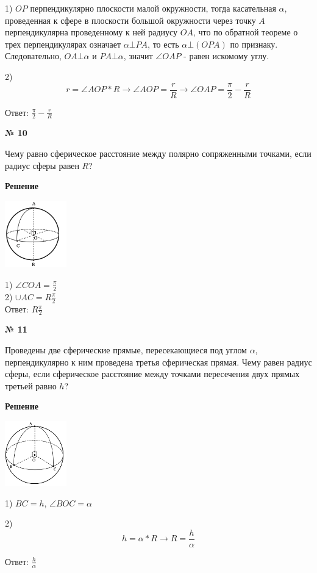     1) $OP$ перпендикулярно плоскости малой окружности, тогда касательная $\alpha$, проведенная к сфере
    в плоскости большой окружности через точку $A$ перпендикулярна проведенному к ней радиусу $OA$,
    что по обратной теореме о трех перпендикулярах означает $\alpha \bot PA$, то есть $\alpha \bot (OPA)$ по признаку.
    Следовательно, $OA \bot \alpha$ и $PA \bot \alpha$, значит $\angle OAP$ - равен искомому углу.

    2)
    \[
        r = \angle AOP * R \rightarrow \angle AOP = \frac{r}{R} \rightarrow \angle OAP = \frac{\pi}{2} - \frac{r}{R}
    \]

    Ответ: $\frac{\pi}{2} - \frac{r}{R}$

    \begin{center}
        \textbf{№ 10}
    \end{center}

    Чему равно сферическое расстояние между полярно сопряженными точками, если радиус сферы равен $R$?

     \textbf{Решение}\\

    \begin{center}
        \includegraphics[width=0.2\textwidth]{images/img13}\\
    \end{center}

    1) $\angle COA = \frac{\pi}{2}$\\

    2) $\cup AC = R\frac{\pi}{2}$\\

    Ответ: $R\frac{\pi}{2}$

    \begin{center}
        \textbf{№ 11}
    \end{center}

    Проведены две сферические прямые, пересекающиеся под углом $\alpha$,
    перпендикулярно к ним проведена третья сферическая прямая.
    Чему равен радиус сферы, если сферическое расстояние между точками пересечения
    двух прямых третьей равно $h$?

    \textbf{Решение}\\

    \begin{center}
        \includegraphics[width=0.2\textwidth]{images/img14}\\
    \end{center}

    1) $BC = h$, $\angle BOC = \alpha$

    2) \[
           h  = \alpha * R \rightarrow R = \frac{h}{\alpha}

    \]

    Ответ: $\frac{h}{\alpha}$

